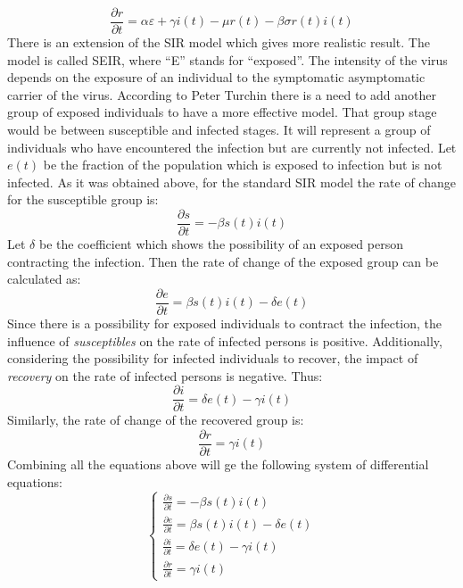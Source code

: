 \begin{equation*}
    \frac{\partial r}{\partial t} = \alpha \varepsilon + \gamma i(t) - \mu r(t) - \beta \sigma r(t)i(t)
\end{equation*}
\hspace{\parindent}There is an extension of the SIR model which gives more realistic result.
The model is called SEIR, where ``E'' stands for ``exposed''.
The intensity of the virus depends on the exposure of an individual to the symptomatic asymptomatic carrier of the virus.
According to Peter Turchin there is a need to add another group of exposed individuals to have a more effective model.
That group stage would be between susceptible and infected stages.
It will represent a group of individuals who have encountered the infection but are currently not infected.
Let $e(t)$ be the fraction of the population which is exposed to infection but is not infected.
As it was obtained above, for the standard SIR model the rate of change for the susceptible group is:
\begin{equation*}
    \frac{\partial s}{\partial t} = -\beta s(t)  i(t)
\end{equation*}
Let $\delta$ be the coefficient which shows the possibility of an exposed person contracting the infection.
Then the rate of change of the exposed group can be calculated as:
\begin{equation*}
    \frac{\partial e}{\partial t} = \beta s(t)  i(t) - \delta e(t)
\end{equation*}
Since there is a possibility for exposed individuals to contract the infection, the influence of \textit{susceptibles} on the rate of infected persons is positive.
Additionally, considering the possibility for infected individuals to recover, the impact of \textit{recovery} on the rate of infected persons is negative.
Thus:
\begin{equation*}
    \frac{\partial i}{\partial t} = \delta e(t) - \gamma i(t)
\end{equation*}
Similarly, the rate of change of the recovered group is:
\begin{equation*}
    \frac{\partial r}{\partial t} = \gamma i(t)
\end{equation*}
Combining all the equations above will ge the following system of differential equations:
\[
\left\{
    \begin{array}{l}
        \frac{\partial s}{\partial t} = -\beta s(t)  i(t)\\
        \frac{\partial e}{\partial t} = \beta s(t)  i(t) - \delta e(t)\\
        \frac{\partial i}{\partial t} = \delta e(t) - \gamma i(t)\\
        \frac{\partial r}{\partial t} = \gamma i(t)
    \end{array}
\right.
\]




